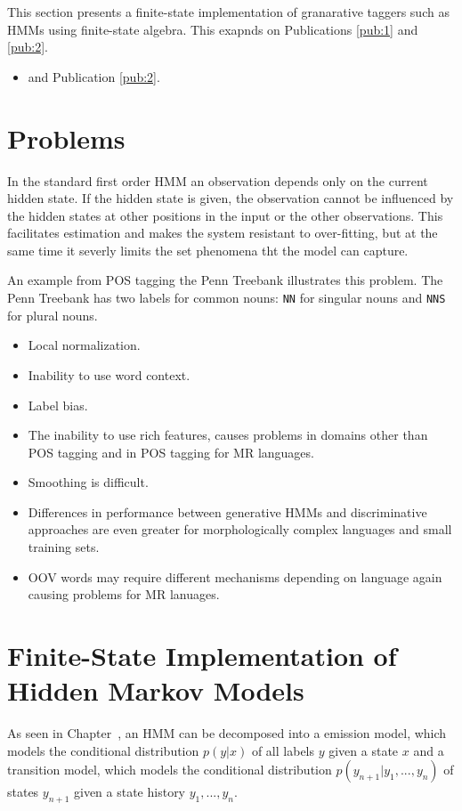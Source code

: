 
This section presents a finite-state implementation of granarative
taggers such as HMMs using finite-state algebra. This exapnds on
Publications \ref{pub:1} and \ref{pub:2}.

\begin{itemize}
\item \cite{Halacsy2007} and Publication \ref{pub:2}.
\end{itemize}

\section{Problems} In the standard first order HMM an observation
depends only on the current hidden state. If the hidden state is
given, the observation cannot be influenced by the hidden states at
other positions in the input or the other observations. This
facilitates estimation and makes the system resistant to over-fitting,
but at the same time it severly limits the set phenomena tht the model
can capture.

An example from POS tagging the Penn Treebank illustrates this
problem. The Penn Treebank has two labels for common nouns: {\tt NN}
for singular nouns and {\tt NNS} for plural nouns.

\begin{itemize}
\item Local normalization.
\item Inability to use word context.
\item Label bias.
\item The inability to use rich features, causes problems in domains
other than POS tagging and in POS tagging for MR languages.
\item Smoothing is difficult.
\item Differences in performance between generative HMMs and
discriminative approaches are even greater for morphologically complex
languages and small training sets.
\item OOV words may require different mechanisms depending on language
again causing problems for MR lanuages.
\end{itemize}


\section{Finite-State Implementation of Hidden Markov Models} As seen
in Chapter~\cite{chapter:hmm}, an HMM can be decomposed into a
emission model, which models the conditional distribution $p(y|x)$ of
all labels $y$ given a state $x$ and a transition model, which models
the conditional distribution $p(y_{n+1} | y_1, ..., y_n)$ of states
$y_{n+1}$ given a state history $y_1, ..., y_n$.

